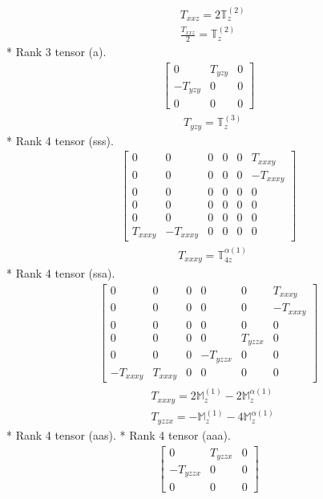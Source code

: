 \documentclass[fleqn,8pt,landscape]{jsarticle}
\begin{document}
\begin{align*}
& T_{xxz} = 2 \mathbb{T}_{z}^{(2)} \\
& \frac{T_{xxz}}{2} = \mathbb{T}_{z}^{(2)}
\end{align*}
* Rank 3 tensor (a).
\begin{align*}
\begin{bmatrix} 0 & T_{yzy} & 0 \\ - T_{yzy} & 0 & 0 \\ 0 & 0 & 0 \end{bmatrix}
\end{align*}
\begin{align*}
& T_{yzy} = \mathbb{T}_{z}^{(3)}
\end{align*}
* Rank 4 tensor (sss).
\begin{align*}
\begin{bmatrix} 0 & 0 & 0 & 0 & 0 & T_{xxxy} \\ 0 & 0 & 0 & 0 & 0 & - T_{xxxy} \\ 0 & 0 & 0 & 0 & 0 & 0 \\ 0 & 0 & 0 & 0 & 0 & 0 \\ 0 & 0 & 0 & 0 & 0 & 0 \\ T_{xxxy} & - T_{xxxy} & 0 & 0 & 0 & 0 \end{bmatrix}
\end{align*}
\begin{align*}
& T_{xxxy} = \mathbb{T}_{4z}^{\alpha(1)}
\end{align*}
* Rank 4 tensor (ssa).
\begin{align*}
\begin{bmatrix} 0 & 0 & 0 & 0 & 0 & T_{xxxy} \\ 0 & 0 & 0 & 0 & 0 & - T_{xxxy} \\ 0 & 0 & 0 & 0 & 0 & 0 \\ 0 & 0 & 0 & 0 & T_{yzzx} & 0 \\ 0 & 0 & 0 & - T_{yzzx} & 0 & 0 \\ - T_{xxxy} & T_{xxxy} & 0 & 0 & 0 & 0 \end{bmatrix}
\end{align*}
\begin{align*}
& T_{xxxy} = 2 \mathbb{M}_{z}^{(1)} - 2 \mathbb{M}_{z}^{\alpha(1)} \\
& T_{yzzx} = - \mathbb{M}_{z}^{(1)} - 4 \mathbb{M}_{z}^{\alpha(1)}
\end{align*}
* Rank 4 tensor (aas).
* Rank 4 tensor (aaa).
\begin{align*}
\begin{bmatrix} 0 & T_{yzzx} & 0 \\ - T_{yzzx} & 0 & 0 \\ 0 & 0 & 0 \end{bmatrix}
\end{align*}
\end{document}
